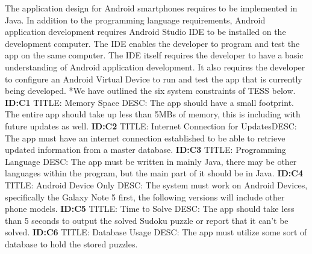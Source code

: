 \documentclass{article}
\begin{document}
The application design for Android smartphones requires to be implemented in Java. In addition to the programming language requirements, Android application development requires Android Studio IDE to be installed on the development computer. The IDE enables the developer to program and test the app on the same computer.\newline \newline
The IDE itself requires the developer to have a basic understanding of Android application development. It also requires the developer to configure an Android Virtual Device to run and test the app that is currently being developed.\newline
\newline
*We have outlined the six system constraints of TESS below. 
\newline
\textbf{ID:C1} \newline TITLE: Memory Space \newline DESC: The app should have a small footprint. The entire app should take up less than 5MBs of memory, this is including with future updates as well.\newline\newline
\textbf{ID:C2} \newline TITLE: Internet Connection for Updates\newline DESC: The app must have an internet connection established to be able to retrieve updated information from a master database. \newline\newline
\textbf{ID:C3} \newline TITLE: Programming Language \newline DESC: The app must be written in mainly Java, there may be other languages within the program, but the main part of it should be in Java.\newline\newline
\textbf{ID:C4} \newline TITLE: Android Device Only \newline DESC: The system must work on Android Devices, specifically the Galaxy Note 5 first, the following versions will include other phone models.\newline\newline
\textbf{ID:C5} \newline TITLE: Time to Solve \newline DESC: The app should take less than 5 seconds to output the solved Sudoku puzzle or report that it can't be solved.\newline\newline
\textbf{ID:C6} \newline TITLE: Database Usage \newline DESC: The app must utilize some sort of database to hold the stored puzzles.\newline\newline
\end{document}
